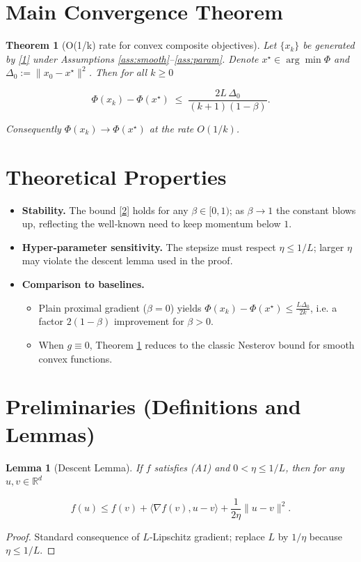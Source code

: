 \documentclass{article}
\newtheorem{theorem}{Theorem}
\newtheorem{lemma}{Lemma}
\newcommand{\grad}{\nabla}
\begin{document}
\section*{Main Convergence Theorem}
\begin{theorem}[O(1/k) rate for convex composite objectives]\label{thm:rate}
Let $\{x_k\}$ be generated by \eqref{1} under Assumptions \ref{ass:smooth}–\ref{ass:param}.  
Denote $x^\star\in\arg\min\Phi$ and $\Delta_0:=\|x_0-x^\star\|^2$.  
Then for all $k\ge 0$  

\[
\Phi(x_k)-\Phi(x^\star)\;\le\;\frac{2L\,\Delta_0}{(k+1)(1-\beta)} .
\tag{2}
\]

Consequently $\Phi(x_k)\to\Phi(x^\star)$ at the rate $O(1/k)$.
\end{theorem}

\section*{Theoretical Properties}
\begin{itemize}
\item \textbf{Stability.} The bound \eqref{2} holds for any $\beta\in[0,1)$; as $\beta\to 1$ the constant blows up, reflecting the well‑known need to keep momentum below $1$.
\item \textbf{Hyper‑parameter sensitivity.} The stepsize must respect $\eta\le 1/L$; larger $\eta$ may violate the descent lemma used in the proof.
\item \textbf{Comparison to baselines.}  
  \begin{itemize}
    \item Plain proximal gradient ($\beta=0$) yields $\Phi(x_k)-\Phi(x^\star)\le \frac{L\Delta_0}{2k}$, i.e. a factor $2(1-\beta)$ improvement for $\beta>0$.
    \item When $g\equiv0$, Theorem \ref{thm:rate} reduces to the classic Nesterov bound for smooth convex functions.
  \end{itemize}
\end{itemize}

\section*{Preliminaries (Definitions and Lemmas)}
\begin{lemma}[Descent Lemma]\label{lem:descent}
If $f$ satisfies (A1) and $0<\eta\le 1/L$, then for any $u,v\in\mathbb{R}^d$  

\[
f(u)\le f(v)+\langle\grad f(v),u-v\rangle+\frac{1}{2\eta}\|u-v\|^{2}.
\tag{3}
\]
\end{lemma}
\begin{proof}
Standard consequence of $L$‑Lipschitz gradient; replace $L$ by $1/\eta$ because $\eta\le1/L$.
\end{proof}
\end{document}
